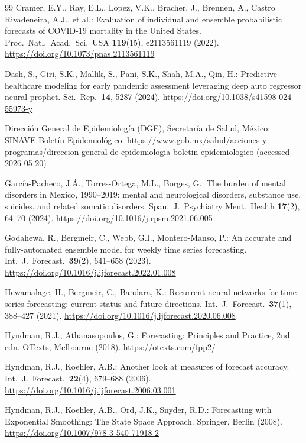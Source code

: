 \documentclass[runningheads]{llncs}
\begin{document}
\begin{thebibliography}{99}
Cramer, E.Y., Ray, E.L., Lopez, V.K., Bracher, J., Brennen, A.,
Castro Rivadeneira, A.J., et al.: Evaluation of individual and ensemble
probabilistic forecasts of
COVID-19 mortality in the United States. Proc.\ Natl.\ Acad.\ Sci.\
USA \textbf{119}(15), e2113561119 (2022).
\url{https://doi.org/10.1073/pnas.2113561119}

Dash, S., Giri, S.K., Mallik, S., Pani, S.K., Shah, M.A., Qin, H.:
Predictive healthcare modeling for early pandemic assessment leveraging
deep auto regressor neural prophet. Sci.\ Rep.\ \textbf{14}, 5287
(2024). \url{https://doi.org/10.1038/s41598-024-55973-y}

Direcci\'on General de Epidemiolog\'ia (DGE), Secretar\'ia de Salud,
M\'exico: SINAVE Bolet\'in Epidemiol\'ogico.
\url{https://www.gob.mx/salud/acciones-y-programas/direccion-general-de-epidemiologia-boletin-epidemiologico}
(accessed 2026-05-20)

Garc\'ia-Pacheco, J.\'A., Torres-Ortega, M.L., Borges, G.: The burden
of mental disorders in Mexico, 1990--2019: mental and neurological
disorders, substance use, suicides, and related somatic disorders.
Span.\ J.\ Psychiatry Ment.\ Health \textbf{17}(2), 64--70 (2024).
\url{https://doi.org/10.1016/j.rpsm.2021.06.005}

Godahewa, R., Bergmeir, C., Webb, G.I., Montero-Manso, P.: An accurate
and fully-automated ensemble model for weekly time series forecasting.
Int.\ J.\ Forecast.\ \textbf{39}(2), 641--658 (2023).
\url{https://doi.org/10.1016/j.ijforecast.2022.01.008}

Hewamalage, H., Bergmeir, C., Bandara, K.: Recurrent neural networks
for time series forecasting: current status and future directions.
Int.\ J.\ Forecast.\ \textbf{37}(1), 388--427 (2021).
\url{https://doi.org/10.1016/j.ijforecast.2020.06.008}

Hyndman, R.J., Athanasopoulos, G.: Forecasting: Principles and
Practice, 2nd edn. OTexts, Melbourne (2018).
\url{https://otexts.com/fpp2/}

Hyndman, R.J., Koehler, A.B.: Another look at measures of forecast
accuracy. Int.\ J.\ Forecast.\ \textbf{22}(4), 679--688 (2006).
\url{https://doi.org/10.1016/j.ijforecast.2006.03.001}

Hyndman, R.J., Koehler, A.B., Ord, J.K., Snyder, R.D.: Forecasting
with Exponential Smoothing: The State Space Approach. Springer, Berlin
(2008). \url{https://doi.org/10.1007/978-3-540-71918-2}


\end{thebibliography}
\end{document}

